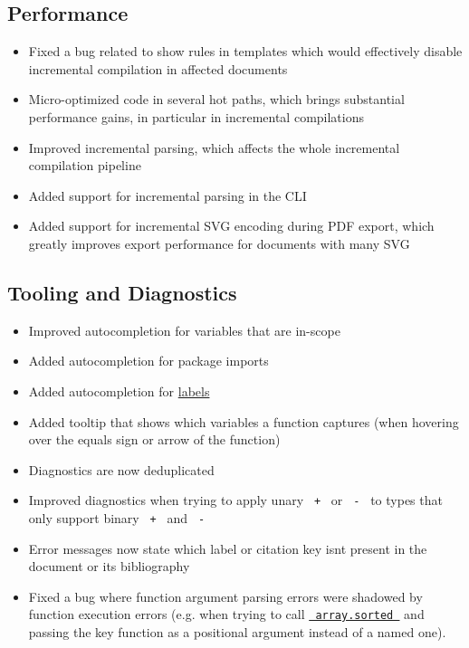 \subsection{Performance}\label{performance}

\begin{itemize}
\tightlist
\item
  Fixed a bug related to show rules in templates which would effectively
  disable incremental compilation in affected documents
\item
  Micro-optimized code in several hot paths, which brings substantial
  performance gains, in particular in incremental compilations
\item
  Improved incremental parsing, which affects the whole incremental
  compilation pipeline
\item
  Added support for incremental parsing in the CLI
\item
  Added support for incremental SVG encoding during PDF export, which
  greatly improves export performance for documents with many SVG
\end{itemize}

\subsection{Tooling and Diagnostics}\label{tooling-and-diagnostics}

\begin{itemize}
\tightlist
\item
  Improved autocompletion for variables that are in-scope
\item
  Added autocompletion for package imports
\item
  Added autocompletion for
  \href{/docs/reference/foundations/label/}{labels}
\item
  Added tooltip that shows which variables a function captures (when
  hovering over the equals sign or arrow of the function)
\item
  Diagnostics are now deduplicated
\item
  Improved diagnostics when trying to apply unary \texttt{\ +\ } or
  \texttt{\ -\ } to types that only support binary \texttt{\ +\ } and
  \texttt{\ -\ }
\item
  Error messages now state which label or citation key
  isn\textquotesingle t present in the document or its bibliography
\item
  Fixed a bug where function argument parsing errors were shadowed by
  function execution errors (e.g. when trying to call
  \href{/docs/reference/foundations/array/\#definitions-sorted}{\texttt{\ array.sorted\ }}
  and passing the key function as a positional argument instead of a
  named one).
\end{itemize}

